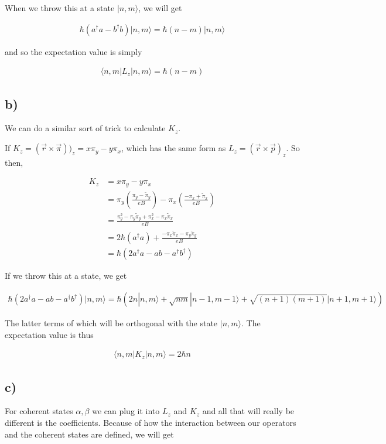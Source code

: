 \documentclass{article}
\newcommand{\p}[1]{\left(#1\right)}
\newcommand{\braket}[1]{\langle#1\rangle}
\newcommand{\bra}[1]{|#1\rangle}
\begin{document}
When we throw this at a state $\bra{n,m}$, we will get

\begin{align*}
    \hbar\p{a^{\dagger}a-b^{\dagger}b}\bra{n,m}=\hbar(n-m)\bra{n,m}
\end{align*}

and so the expectation value is simply

\begin{align*}
    \braket{n,m|L_z|n,m}=\hbar(n-m)
\end{align*}

\subsection*{b)}

We can do a similar sort of trick to calculate $K_z$.

If $K_z=(\vec{r}\times\vec{\pi}))_z=x\pi_y-y\pi_x$, which has the same form as $L_z=(\vec{r}\times\vec{p})_z$. So then, 

\begin{align*}
    K_z&=x\pi_y-y\pi_x\\[1em]
    &=\pi_y\p{\frac{\pi_y-\tilde{\pi}_y}{eB}}-\pi_x\p{\frac{-\pi_x+\tilde{\pi}_x}{eB}}\\[1em]
    &=\frac{\pi_y^2-\pi_y\tilde{\pi}_y+\pi_x^2-\pi_x\tilde{\pi}_x}{eB}\\[1em]
    &=2\hbar\p{a^{\dagger}a}+\frac{-\pi_x\tilde{\pi}_x-\pi_y\tilde{\pi}_y}{eB}\\[1em]
    &=\hbar\p{2a^{\dagger}a-ab-a^{\dagger}b^{\dagger}}
\end{align*}

If we throw this at a state, we get

\begin{align*}
    \hbar\p{2a^{\dagger}a-ab-a^{\dagger}b^{\dagger}}\bra{n,m}=\hbar\p{2n\bra{n,m}+\sqrt{nm}\bra{n-1,m-1}+\sqrt{(n+1)(m+1)}\bra{n+1,m+1}}
\end{align*}

The latter terms of which will be orthogonal with the state $\bra{n,m}$. The expectation value is thus

\begin{align*}
    \braket{n,m|K_z|n,m}=2\hbar{n}
\end{align*}

\subsection*{c)}
For coherent states $\alpha,\beta$ we can plug it into $L_z$ and $K_z$ and all that will really be different is the coefficients. Because of how the interaction between our operators and the coherent states are defined, we will get
\end{document}
